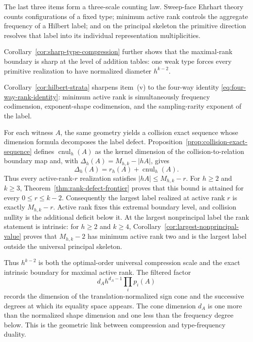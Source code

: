 \documentclass[11pt,reqno]{amsart}
\theoremstyle{definition}
\theoremstyle{remark}
\begin{document}
The last three items form a three-scale counting law.  Sweep-face Ehrhart
theory counts configurations of a fixed type; minimum active rank controls
the aggregate frequency of a Hilbert label; and on the principal skeleton
the primitive direction resolves that label into its individual
representation multiplicities.

Corollary~\ref{cor:sharp-type-compression} further shows that the maximal-rank
boundary is sharp at the level of addition tables: one weak type forces every
primitive realization to have normalized diameter $h^{k-2}$.

Corollary~\ref{cor:hilbert-strata} sharpens item~\textup{(v)} to the four-way
identity \eqref{eq:four-way-rank-identity}: minimum active rank is
simultaneously frequency codimension, exponent-shape codimension, and the
sampling-rarity exponent of the label.

For each witness $A$, the same geometry yields a collision exact sequence
whose dimension formula decomposes the label defect.
Proposition~\ref{prop:collision-exact-sequence} defines
$\operatorname{cnul}_h(A)$ as the kernel dimension of the
collision-to-relation boundary map and, with
$\Delta_h(A)=M_{h,k}-|hA|$, gives
\begin{equation}\label{eq:defect-rank-nullity-intro}
 \Delta_h(A)=r_h(A)+\operatorname{cnul}_h(A).
\end{equation}
Thus every active-rank-$r$ realization satisfies $|hA|\leq M_{h,k}-r$.
For $h\geq2$ and $k\geq3$,
Theorem~\ref{thm:rank-defect-frontier} proves that this bound is attained for
every $0\leq r\leq k-2$.  Consequently the largest label realized at active
rank $r$ is exactly $M_{h,k}-r$.  Active rank fixes this extremal boundary
level, and collision nullity is the additional deficit below it.  At the
largest nonprincipal label the rank statement is intrinsic: for $h\geq2$ and
$k\geq4$,
Corollary~\ref{cor:largest-nonprincipal-value} proves that $M_{h,k}-2$ has
minimum active rank two and is the largest label outside the universal
principal skeleton.

Thus $h^{k-2}$ is both the optimal-order universal compression scale and the
exact intrinsic boundary for maximal active rank.  The filtered factor
\[
 d_Ah^{d_A-1}\prod_i p_i(A)
\]
records the dimension of the translation-normalized sign cone and the
successive degrees at which its equality space appears.  The cone dimension
$d_A$ is one more than the normalized shape dimension and one less than the
frequency degree below.  This is the geometric link between compression and
type-frequency duality.
\end{document}
